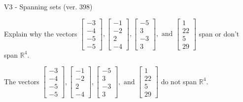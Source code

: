 \begin{exercise}
  \begin{exerciseTitle}V3 - Spanning sets (ver. 398)\end{exerciseTitle}
  \begin{exerciseStatement}
    Explain why the vectors \(\left[\begin{array}{r}
-3 \\
-4 \\
-5 \\
-5
\end{array}\right] , \left[\begin{array}{r}
-1 \\
-2 \\
2 \\
-4
\end{array}\right] , \left[\begin{array}{r}
-5 \\
3 \\
-3 \\
3
\end{array}\right] , \text{ and } \left[\begin{array}{r}
1 \\
22 \\
5 \\
29
\end{array}\right]\) span or don't span \(\mathbb{R}^4\). 
	


  \end{exerciseStatement}
  \begin{exerciseAnswer}
   The vectors \(\left[\begin{array}{r}
-3 \\
-4 \\
-5 \\
-5
\end{array}\right] , \left[\begin{array}{r}
-1 \\
-2 \\
2 \\
-4
\end{array}\right] , \left[\begin{array}{r}
-5 \\
3 \\
-3 \\
3
\end{array}\right] , \text{ and } \left[\begin{array}{r}
1 \\
22 \\
5 \\
29
\end{array}\right]\) 
  	 do not  
	span \(\mathbb{R}^4\).
  


  \end{exerciseAnswer}
\end{exercise}